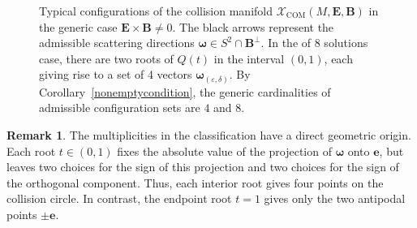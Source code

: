 \documentclass[12pt]{article}
\theoremstyle{plain}
\theoremstyle{definition}
\newtheorem{remark}[theorem]{Remark}
\newcommand{\R}{\mathbb{R}}
\begin{document}
\begin{figure}[ht!]
\centering

\caption{Typical configurations of the collision manifold
$\mathcal X_{\mathrm{COM}}(M,\bm E,\bm B)$ in the generic case
$\bm E\times\bm B\neq0$. The black arrows represent the admissible
scattering directions $\bm\omega\in S^2\cap\bm B^\perp$. In the of 8 solutions case, there are two roots of $Q(t)$ in the interval $(0,1)$, each giving rise to a set of 4 vectors $\bm\omega_{(\varepsilon,\delta)}$. By Corollary~\ref{nonemptycondition}, the generic
cardinalities of admissible configuration sets are $4$ and $8$.}
\label{fig:cardinality}
\end{figure}

\begin{remark}
The multiplicities in the classification have a direct geometric origin. Each root $t\in(0,1)$ fixes the absolute value of the projection of ${\bm\omega}$ onto ${\bm e}$, but leaves two choices for the sign of this projection and two choices for the sign of the orthogonal component. Thus, each interior root gives four points on the collision circle. In contrast, the endpoint root $t=1$ gives only the two antipodal points $\pm{\bm e}$. 
\end{remark}
\end{document}
